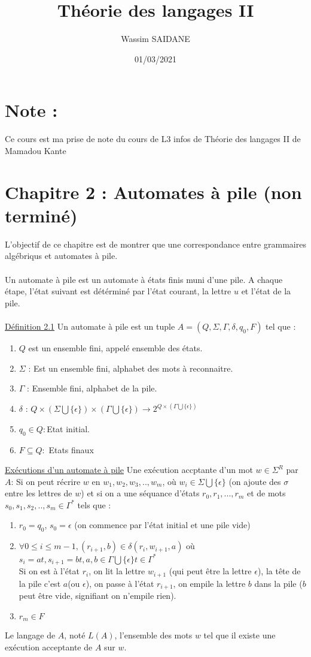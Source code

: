 \documentclass{article}
\title{Théorie des langages II}
\author{Wassim SAIDANE}
\date{01/03/2021}
\begin{document}
    \maketitle
    \section*{Note : }
    Ce cours est ma prise de note du cours de L3 infos de Théorie des langages II de Mamadou Kante
    \section*{Chapitre 2 : Automates à pile (non terminé)}
    L'objectif de ce chapitre est de montrer que une correspondance entre grammaires algébriqus et automates à pile. \\
    \\
    Un automate à pile est un automate à états finis muni d'une pile. A chaque étape, l'état suivant est détérminé par l'état courant, la lettre $u$ et l'état de la pile. \\
    \\
    \underline{Définition 2.1} Un automate à pile est un tuple $A=(Q, \Sigma, \Gamma, \delta, q_0, F)$ tel que : 
    \begin{enumerate}
        \item $Q$ est un ensemble fini, appelé ensemble des états. 
        \item $\Sigma$ : Est un ensemble fini, alphabet des mots à reconnaitre. 
        \item $\Gamma$ : Ensemble fini, alphabet de la pile. 
        \item $\delta$ : $Q \times (\Sigma \bigcup \{\epsilon\}) \times (\Gamma \bigcup \{\epsilon\}) \rightarrow 2^{Q \times (\Gamma \bigcup \{\epsilon\})}$
        \item $q_0 \in Q : $Etat initial. 
        \item $F \subseteq Q :$ Etats finaux 
    \end{enumerate}
    \underline{Exécutions d'un automate à pile}
    Une exécution accptante d'un mot $w \in \Sigma^R$ par $A$: Si on peut récrire $w$ en $w_1,w_2,w_3,..,w_m$, où $w_i \in \Sigma \bigcup \{\epsilon\}$ (on ajoute des $\sigma$ entre les lettres de $w$) et si on a une séquance d'états $r_0,r_1,...,r_m$ et de mots $s_0,s_1,s_2,..,s_m \in \Gamma^*$ tels que : \\
    \begin{enumerate}
        \item $r_0=q_0$, $s_0=\epsilon$ (on commence par l'état initial et une pile vide)
        \item $\forall 0 \le i \le m-1, (r_{i+1},b) \in \delta (r_i, w_{i+1}, a)$ où $s_i=at, s_{i+1}=bt, a,b \in \Gamma \bigcup \{\epsilon\} t \in \Gamma^*$ \\
        Si on est à l'état $r_i$, on lit la lettre $w_{i+1}$ (qui peut être la lettre $\epsilon$), la tête de la pile c'est $a$(ou $\epsilon$), on passe à l'état $r_{i+1}$, on empile la lettre $b$ dans la pile ($b$ peut être vide, signifiant on n'empile rien). \\
        \item $r_m \in F$
    \end{enumerate}
    Le langage de $A$, noté $L(A)$, l'ensemble des mots $w$ tel que il existe une exécution acceptante de $A$ sur $w$.
\end{document}
